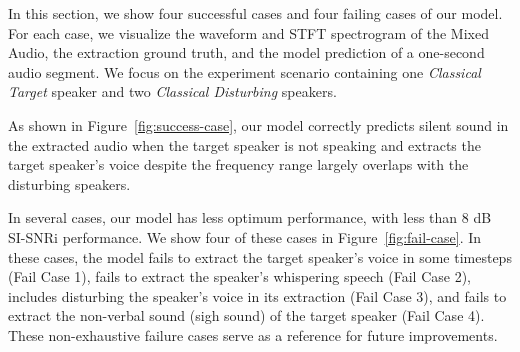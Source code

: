 In this section, we show four successful cases and four failing cases of our model. For each case, we visualize the waveform and STFT spectrogram of the Mixed Audio, the extraction ground truth, and the model prediction of a one-second audio segment. We focus on the experiment scenario containing one \textit{Classical Target} speaker and two \textit{Classical Disturbing} speakers.

As shown in Figure~\ref{fig:success-case}, our model correctly predicts silent sound in the extracted audio when the target speaker is not speaking and extracts the target speaker's voice despite the frequency range largely overlaps with the disturbing speakers. 

In several cases, our model has less optimum performance, with less than 8 dB SI-SNRi performance. We show four of these cases in Figure~\ref{fig:fail-case}. In these cases, the model fails to extract the target speaker's voice in some timesteps (Fail Case 1), fails to extract the speaker's whispering speech (Fail Case 2), includes disturbing the speaker's voice in its extraction (Fail Case 3), and fails to extract the non-verbal sound (sigh sound) of the target speaker (Fail Case 4). These non-exhaustive failure cases serve as a reference for future improvements.
